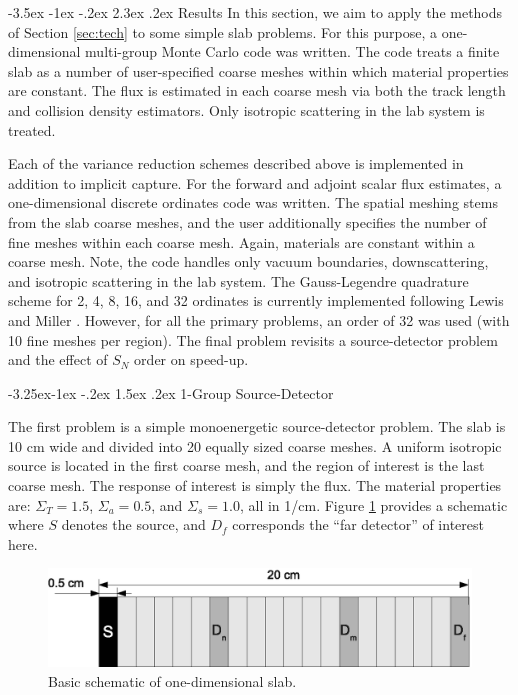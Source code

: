 \documentclass[letter,11pt]{article}
\makeatletter
\renewcommand\section{\@startsection{section}{1}{\z@}%
                                {-3.5ex \@plus -1ex \@minus -.2ex}%
                                {2.3ex \@plus.2ex}%
                                {\normalfont\large\bf}}
\renewcommand\subsection{\@startsection{subsection}{2}{\z@}%
                                {-3.25ex\@plus -1ex \@minus -.2ex}%
                                {1.5ex \@plus .2ex}%
                                {\normalfont\itshape\bf}}
\makeatother
\begin{document}
\section{Results}
\label{sec:results}
In this section, we aim to apply the methods of Section \ref{sec:tech} to some simple slab problems.  For this purpose, a one-dimensional multi-group Monte Carlo code was written.  The code treats a finite slab as a number of user-specified coarse meshes within which material properties are constant.  The flux is estimated in each coarse mesh via both the track length and collision density estimators.  Only isotropic scattering in the lab system is treated.

Each of the variance reduction schemes described above is implemented in addition to implicit capture.  For the forward and adjoint scalar flux estimates, a one-dimensional discrete ordinates code was written.  The spatial meshing stems from the slab coarse meshes, and the user additionally specifies the number of fine meshes within each coarse mesh.  Again, materials are constant within a coarse mesh.  Note, the code handles only vacuum boundaries, downscattering, and isotropic scattering in the lab system.  The Gauss-Legendre quadrature scheme for 2, 4, 8, 16, and 32 ordinates is currently implemented following Lewis and Miller \cite{lewis1993cmn}.  However, for all the primary problems, an order of 32 was used (with 10 fine meshes per region).  The final problem revisits a source-detector problem and the effect of $S_N$ order on speed-up.

\subsection{1-Group Source-Detector}

The first problem is a simple monoenergetic source-detector problem.  The slab is 10 cm wide and divided into 20 equally sized coarse meshes.  A uniform isotropic source is located in the first coarse mesh, and the region of interest is the last coarse mesh.  The response of interest is simply the flux.  The material properties are: $\Sigma_T = 1.5$, $\Sigma_a = 0.5$, and $\Sigma_s = 1.0$, all in 1/cm.  Figure \ref{fig:diagram_of_slab} provides a schematic where $S$ denotes the source, and $D_f$ corresponds the ``far detector'' of interest here.

\begin{figure}[h] 
   \centering
   \includegraphics[keepaspectratio, width = 5.0 in]{diagram_of_slab}
   \caption{Basic schematic of one-dimensional slab.}
   \label{fig:diagram_of_slab}
\end{figure}
\end{document}
